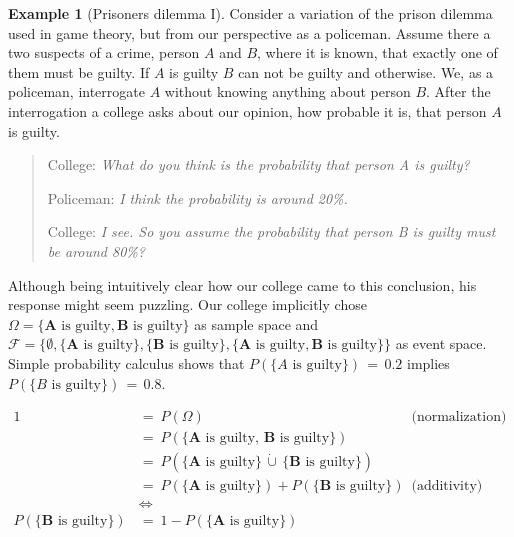 \documentclass[
]{report}
\theoremstyle{definition}
\theoremstyle{definition}
\newtheorem{example}{Example}[section]
\begin{document}
\begin{example}[Prisoners dilemma I]\label{ex:prisoners1}
Consider a variation of the prison dilemma used in game theory, but from our perspective as a policeman. Assume there a two suspects of a crime, person $A$ and $B$, where it is known, that exactly one of them must be guilty. If $A$ is guilty $B$ can not be guilty and otherwise. We, as a policeman, interrogate $A$ without knowing anything about person $B$. After the interrogation a college asks about our opinion, how probable it is, that person $A$ is guilty.

\begin{quote}
College: \textit{What do you think is the probability that person A is guilty?} \par
Policeman: \textit{I think the probability is around 20\%.} \par
College: \textit{I see. So you assume the probability that person B is guilty must be around 80\%?}
\end{quote}

Although being intuitively clear how our college came to this conclusion, his response might seem puzzling. Our college implicitly chose $\Omega = \{\mathbf{A} \text{ is guilty}, \mathbf{B} \text{ is guilty} \}$ as sample space and $\mathcal{F} = \{ \emptyset, \{ \mathbf{A} \text{ is guilty} \}, \{ \mathbf{B} \text{ is guilty} \}, \{ \mathbf{A} \text{ is guilty}, \mathbf{B} \text{ is guilty} \} \}$ as event space. Simple probability calculus shows that $P(\{A \text{ is guilty}\}) \, = \, 0.2$ implies $P(\{B \text{ is guilty}\}) \, = \,  0.8$.

\begin{align*}
1 \ &= \ P(\Omega) & \text{(normalization)}\\
  &= \ P(\{\mathbf{A} \text{ is guilty}, \, \mathbf{B} \text{ is guilty}\}) \\
  &= \ P(\{\mathbf{A} \text{ is guilty}\} \, \dot\cup \, \{\mathbf{B} \text{ is guilty}\}) & \text{}\\
  &= \ P(\{\mathbf{A} \text{ is guilty}\}) + P(\{\mathbf{B} \text{ is guilty}\}) & \text{(additivity)}\\
  & \Leftrightarrow \\
P(\{\mathbf{B} \text{ is guilty}\}) \ &= \ 1 - P(\{\mathbf{A} \text{ is guilty}\})
\end{align*}



\end{example}
\end{document}
